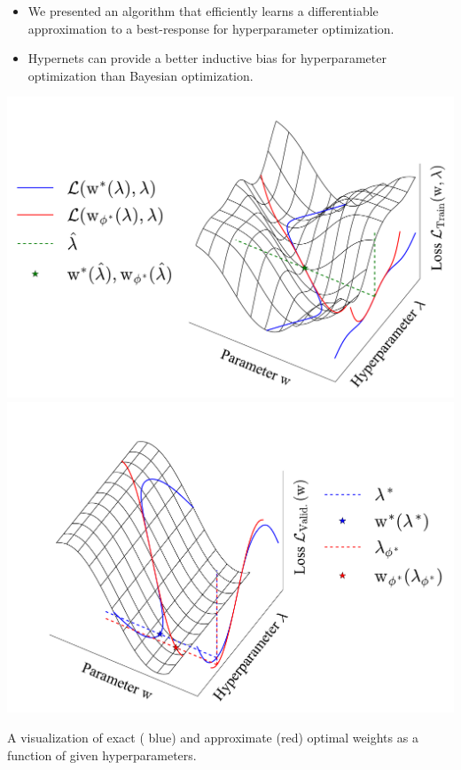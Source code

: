 \documentclass[landscape,a0b,final,a4resizeable]{include/a0poster}
\begin{document}
\begin{poster}
\begin{multicols}{3}
\begin{itemize}
	\item We presented an algorithm that efficiently learns a differentiable approximation to a best-response for hyperparameter optimization.
	\item Hypernets can provide a better inductive bias for hyperparameter optimization than Bayesian optimization.
\end{itemize}

\begin{minipage}[c]{36cm}
\begin{center}
  	\includegraphics[width=17.5cm]{figures/train_loss_manifold.pdf}
	\includegraphics[width=17.5cm]{figures/valid_loss_manifold.pdf}
	\caption{
	A visualization of exact ({\color{blue} blue}) and approximate ({\color{red}red}) optimal weights as a function of given hyperparameters.
}
\end{center}
\end{minipage}
\end{multicols}
\end{poster}
\end{document}

